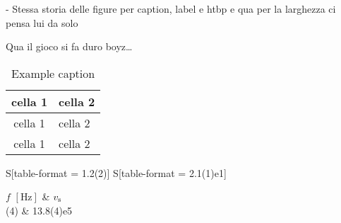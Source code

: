 

- Stessa storia delle figure per caption, label e htbp e qua per la larghezza ci pensa lui da solo

Qua il gioco si fa duro boyz…


\begin{table}[htbp]
  \begin{tabular}{
    c %
    l %
    } 
  \toprule
cella 1 & cella 2 \\ %
  \midrule 
cella 1 & cella 2 \\
cella 1 & cella 2 \\ %
  \bottomrule
  \end{tabular}
\caption{Example caption} %
\end{table}





\begin{table}[htbp]
  \begin{tabular}{
   
    S[table-format = 1.2(2)]  
	S[table-format = 2.1(1)e1]
 } 
			
 \toprule
{$f$ $[\unit{\hertz}]$} & {$v_{\textup{s}}$} \\ %
	
 (4)	 & 13.8(4)e5 \\

    
 \bottomrule
\end{tabular}
    \caption{Example caption} %
\end{table}